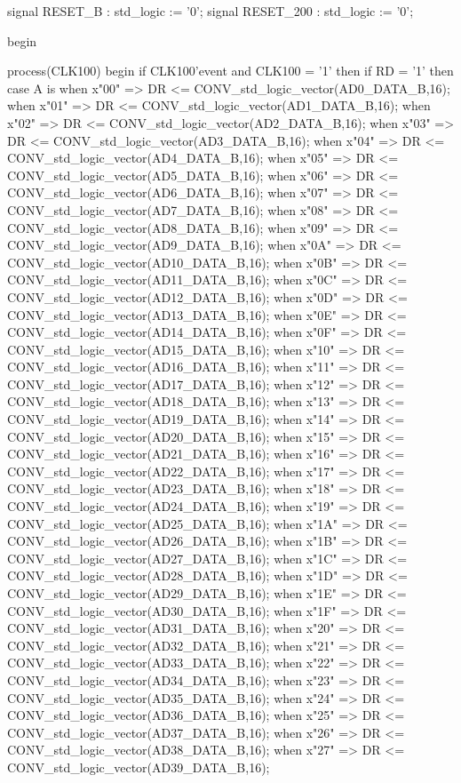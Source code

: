 \begin{mylisting}[language=VHDL,caption=AD変換モジュール,label=appF_ADC_module_VHDL]
	signal RESET_B		: std_logic							:= '0';
	signal RESET_200	: std_logic							:= '0';



begin

	process(CLK100)
	begin
		if CLK100'event and CLK100 = '1' then
			if RD = '1' then
				case A is
					when x"00"	=>	DR <= CONV_std_logic_vector(AD0_DATA_B,16);
					when x"01"	=>	DR <= CONV_std_logic_vector(AD1_DATA_B,16);
					when x"02"	=>	DR <= CONV_std_logic_vector(AD2_DATA_B,16);
					when x"03"	=>	DR <= CONV_std_logic_vector(AD3_DATA_B,16);
					when x"04"	=>	DR <= CONV_std_logic_vector(AD4_DATA_B,16);
					when x"05"	=>	DR <= CONV_std_logic_vector(AD5_DATA_B,16);
					when x"06"	=>	DR <= CONV_std_logic_vector(AD6_DATA_B,16);
					when x"07"	=>	DR <= CONV_std_logic_vector(AD7_DATA_B,16);
					when x"08"	=>	DR <= CONV_std_logic_vector(AD8_DATA_B,16);
					when x"09"	=>	DR <= CONV_std_logic_vector(AD9_DATA_B,16);
					when x"0A"	=>	DR <= CONV_std_logic_vector(AD10_DATA_B,16);
					when x"0B"	=>	DR <= CONV_std_logic_vector(AD11_DATA_B,16);
					when x"0C"	=>	DR <= CONV_std_logic_vector(AD12_DATA_B,16);
					when x"0D"	=>	DR <= CONV_std_logic_vector(AD13_DATA_B,16);
					when x"0E"	=>	DR <= CONV_std_logic_vector(AD14_DATA_B,16);
					when x"0F"	=>	DR <= CONV_std_logic_vector(AD15_DATA_B,16);
					when x"10"	=>	DR <= CONV_std_logic_vector(AD16_DATA_B,16);
					when x"11"	=>	DR <= CONV_std_logic_vector(AD17_DATA_B,16);
					when x"12"	=>	DR <= CONV_std_logic_vector(AD18_DATA_B,16);
					when x"13"	=>	DR <= CONV_std_logic_vector(AD19_DATA_B,16);
					when x"14"	=>	DR <= CONV_std_logic_vector(AD20_DATA_B,16);
					when x"15"	=>	DR <= CONV_std_logic_vector(AD21_DATA_B,16);
					when x"16"	=>	DR <= CONV_std_logic_vector(AD22_DATA_B,16);
					when x"17"	=>	DR <= CONV_std_logic_vector(AD23_DATA_B,16);
					when x"18"	=>	DR <= CONV_std_logic_vector(AD24_DATA_B,16);
					when x"19"	=>	DR <= CONV_std_logic_vector(AD25_DATA_B,16);
					when x"1A"	=>	DR <= CONV_std_logic_vector(AD26_DATA_B,16);
					when x"1B"	=>	DR <= CONV_std_logic_vector(AD27_DATA_B,16);
					when x"1C"	=>	DR <= CONV_std_logic_vector(AD28_DATA_B,16);
					when x"1D"	=>	DR <= CONV_std_logic_vector(AD29_DATA_B,16);
					when x"1E"	=>	DR <= CONV_std_logic_vector(AD30_DATA_B,16);
					when x"1F"	=>	DR <= CONV_std_logic_vector(AD31_DATA_B,16);
					when x"20"	=>	DR <= CONV_std_logic_vector(AD32_DATA_B,16);
					when x"21"	=>	DR <= CONV_std_logic_vector(AD33_DATA_B,16);
					when x"22"	=>	DR <= CONV_std_logic_vector(AD34_DATA_B,16);
					when x"23"	=>	DR <= CONV_std_logic_vector(AD35_DATA_B,16);
					when x"24"	=>	DR <= CONV_std_logic_vector(AD36_DATA_B,16);
					when x"25"	=>	DR <= CONV_std_logic_vector(AD37_DATA_B,16);
					when x"26"	=>	DR <= CONV_std_logic_vector(AD38_DATA_B,16);
					when x"27"	=>	DR <= CONV_std_logic_vector(AD39_DATA_B,16);
				

\end{mylisting}
